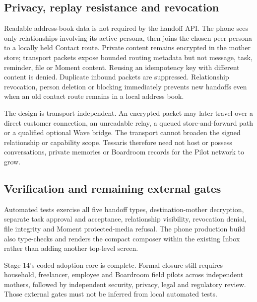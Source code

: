 \subsection{Privacy, replay resistance and revocation}

Readable address-book data is not required by the handoff API.  The phone sees only
relationships involving its active persona, then joins the chosen peer persona to a
locally held Contact route.  Private content remains encrypted in the mother store;
transport packets expose bounded routing metadata but not message, task, reminder,
file or Moment content.  Reusing an idempotency key with different content is denied.
Duplicate inbound packets are suppressed.  Relationship revocation, person deletion
or blocking immediately prevents new handoffs even when an old contact route remains
in a local address book.

The design is transport-independent.  An encrypted packet may later travel over a
direct customer connection, an unreadable relay, a queued store-and-forward path or a
qualified optional Wave bridge.  The transport cannot broaden the signed relationship
or capability scope.  Tessaris therefore need not host or possess conversations,
private memories or Boardroom records for the Pilot network to grow.

\subsection{Verification and remaining external gates}

Automated tests exercise all five handoff types, destination-mother decryption,
separate task approval and acceptance, relationship visibility, revocation denial,
file integrity and Moment protected-media refusal.  The phone production build also
type-checks and renders the compact composer within the existing Inbox rather than
adding another top-level screen.

Stage 14's coded adoption core is complete.  Formal closure still requires household,
freelancer, employee and Boardroom field pilots across independent mothers, followed
by independent security, privacy, legal and regulatory review.  Those external gates
must not be inferred from local automated tests.
